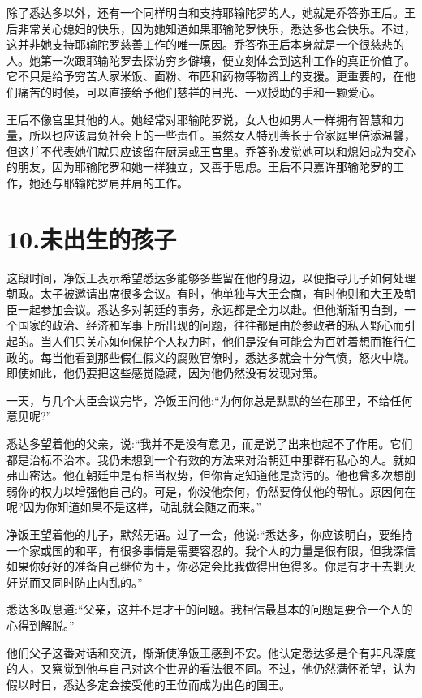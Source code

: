 \documentclass[12pt,twoside,openany]{book}
\begin{document}
除了悉达多以外，还有一个同样明白和支持耶输陀罗的人，她就是乔答弥王后。王后非常关心媳妇的快乐，因为她知道如果耶输陀罗快乐，悉达多也会快乐。不过，这并非她支持耶输陀罗慈善工作的唯一原因。乔答弥王后本身就是一个很慈悲的人。她第一次跟耶输陀罗去探访穷乡僻壤，便立刻体会到这种工作的真正价值了。它不只是给予穷苦人家米饭、面粉、布匹和药物等物资上的支援。更重要的，在他们痛苦的时候，可以直接给予他们慈祥的目光、一双授助的手和一颗爱心。

王后不像宫里其他的人。她经常对耶输陀罗说，女人也如男人一样拥有智慧和力量，所以也应该肩负社会上的一些责任。虽然女人特别善长于令家庭里倍添温馨，但这并不代表她们就只应该留在厨房或王宫里。乔答弥发觉她可以和熄妇成为交心的朋友，因为耶输陀罗和她一样独立，又善于思虑。王后不只嘉许那输陀罗的工作，她还与耶输陀罗肩并肩的工作。

\chapter{10.未出生的孩子}\label{ch10}

这段时间，净饭王表示希望悉达多能够多些留在他的身边，以便指导儿子如何处理朝政。太子被邀请出席很多会议。有时，他单独与大王会商，有时他则和大王及朝臣一起参加会议。悉达多对朝廷的事务，永远都是全力以赴。但他渐渐明白到，一个国家的政治、经济和军事上所出现的问题，往往都是由於参政者的私人野心而引起的。当人们只关心如何保护个人权力时，他们是没有可能会为百姓着想而推行仁政的。每当他看到那些假仁假义的腐败官僚时，悉达多就会十分气愤，怒火中烧。即使如此，他仍要把这些感觉隐藏，因为他仍然没有发现对策。

一天，与几个大臣会议完毕，净饭王问他:“为何你总是默默的坐在那里，不给任何意见呢?”

悉达多望着他的父亲，说:“我并不是没有意见，而是说了出来也起不了作用。它们都是治标不治本。我仍未想到一个有效的方法来对治朝廷中那群有私心的人。就如弗山密达。他在朝廷中是有相当权势，但你肯定知道他是贪污的。他也曾多次想削弱你的权力以增强他自己的。可是，你没他奈何，仍然要倚仗他的帮忙。原因何在呢?因为你知道如果不是这样，动乱就会随之而来。”

净饭王望着他的儿子，默然无语。过了一会，他说:“悉达多，你应该明白，要维持一个家或国的和平，有很多事情是需要容忍的。我个人的力量是很有限，但我深信如果你好好的准备自己继位为王，你必定会比我做得出色得多。你是有才干去剿灭奸党而又同时防止内乱的。”

悉达多叹息道:“父亲，这并不是才干的问题。我相信最基本的问题是要令一个人的心得到解脱。”

他们父子这番对话和交流，惭渐使净饭王感到不安。他认定悉达多是个有非凡深度的人，又察觉到他与自己对这个世界的看法很不同。不过，他仍然满怀希望，认为假以时日，悉达多定会接受他的王位而成为出色的国王。
\end{document}
